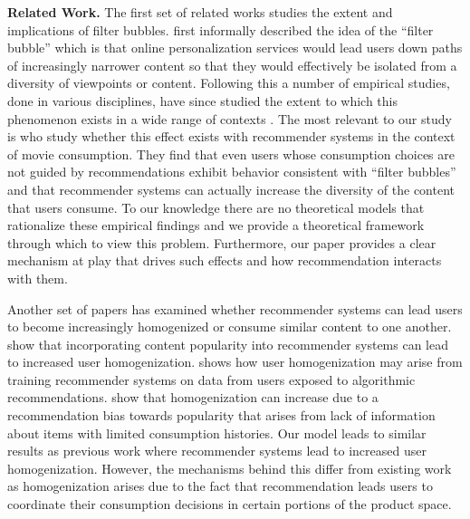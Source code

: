 \documentclass[format=acmsmall, review=false]{acmart}
\begin{document}
\textbf{Related Work.} 
The first set of related works studies the extent and implications of filter bubbles. \cite{pariser2011filter} first informally described the idea of the ``filter bubble'' which is that online personalization services would lead users down paths of increasingly narrower content so that they would effectively be isolated from a diversity of viewpoints or content. Following this a number of empirical studies, done in various disciplines, have since studied the extent to which this phenomenon exists in a wide range of contexts \cite{flaxman2016filter,hosanagar2013will,moller2018blame,nguyen2014exploring}. The most relevant to our study is \cite{nguyen2014exploring} who study whether this effect exists with recommender systems in the context of movie consumption. They find that even users whose consumption choices are not guided by recommendations exhibit behavior consistent with ``filter bubbles'' and that recommender systems can actually increase the diversity of the content that users consume. To our knowledge there are no theoretical models that rationalize these empirical findings and we provide a theoretical framework through which to view this problem. Furthermore, our paper provides a clear mechanism at play that drives such effects and how recommendation interacts with them.
\par 
Another set of papers has examined whether recommender systems can lead users to become increasingly homogenized or consume similar content to one another. \cite{celma2008hits, treviranus2009value} show that incorporating content popularity into recommender systems can lead to increased user homogenization. \cite{chaney2018algorithmic} shows how user homogenization may arise from training recommender systems on data from users exposed to algorithmic recommendations. \cite{fleder2009blockbuster} show that homogenization can increase due to a recommendation bias towards popularity that arises from lack of information about items with limited consumption histories. Our model leads to similar results as previous work where recommender systems lead to increased user homogenization. However, the mechanisms behind this differ from existing work as homogenization arises due to the fact that recommendation leads users to coordinate their consumption decisions in certain portions of the product space.
\par
\end{document}
